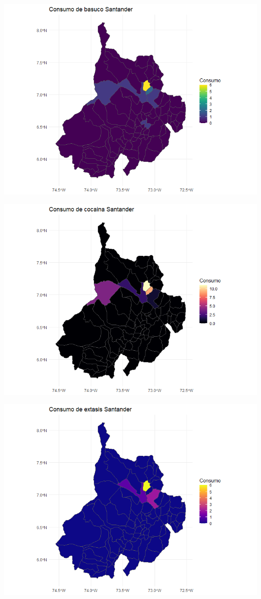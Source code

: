 \documentclass[
]{article}
\begin{document}
\includegraphics{images/Mapa consumo de basuco en santander.png}

\includegraphics{images/Mapa consumo de cocaina en santander.png}

\includegraphics{images/Mapa consumo de extasis en satander.png}
\end{document}
